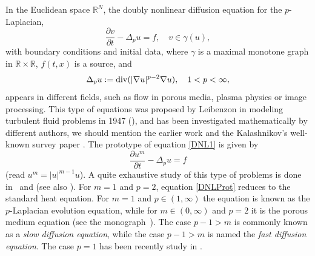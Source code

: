 \documentclass[reqno,12pt]{amsart}
\def\R{\mathbb R} %
\numberwithin{equation}{section} %
\begin{document}
In the Euclidean space $\R^N$, the doubly nonlinear diffusion equation for the $p$-Laplacian,
\begin{equation}\label{DNL1}
\frac{\partial v}{ \partial t} -\Delta_p u=f, \quad v \in \gamma(u),
\end{equation}  with boundary conditions and initial data,
where $\gamma$ is a maximal monotone graph in $\R \times \R$, $f(t,x)$ is a source, and
$$\Delta_p u:= {\rm div}( \vert \nabla u \vert^{p-2} \nabla u), \quad 1 < p < \infty,$$ appears in different fields, such as flow in porous media, plasma physics or  image processing. This type of equations was proposed by Leibenzon in modeling
turbulent fluid problems in 1947 (\cite{L}), and  has been investigated mathematically by different authors,  we should mention the earlier work  \cite{Ba}  and the Kalashnikov’s well-known survey paper \cite{K}.   The prototype of equation \eqref{DNL1} is given by
\begin{equation}\label{DNLProt}
\frac{\partial u^m}{ \partial t} -\Delta_p u=f
\end{equation}
(read $u^m=|u|^{m-1}u$).  A quite exhaustive study of this type of problems is done in~\cite{AndIgMazTo06} and \cite{AndIgMazTo07} (see also \cite{BDMS18}).
For $m=1$ and $p =2$, equation  \eqref{DNLProt} reduces to
the standard heat equation. For $m = 1$ and $p \in  (1, \infty)$ the equation is known as the $p$-Laplacian   evolution  equation, while for $m \in (0, \infty)$ and $p=2$   it is  the porous medium equation  (see the monograph~\cite{V}).   
The case $p - 1 > m$ is
commonly known as a {\it slow diffusion equation}, while the case $p -1 > m$ is named the {\it fast diffusion equation}. 
The case $p=1$ has been recently study in \cite{MMT23}.

 
\end{document}
